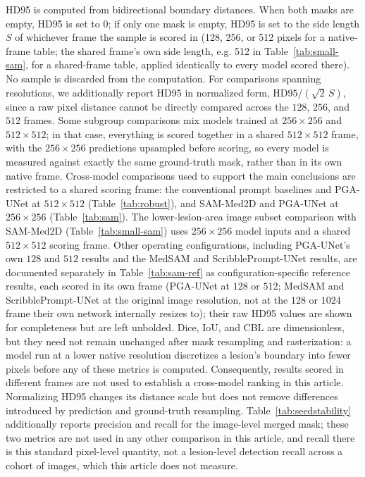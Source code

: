 HD95 is computed from bidirectional boundary distances. When both masks are empty, HD95 is set to 0; if only one mask is empty, HD95 is set to the side length $S$ of whichever frame the sample is scored in (128, 256, or 512 pixels for a native-frame table; the shared frame's own side length, e.g. 512 in Table~\ref{tab:small-sam}, for a shared-frame table, applied identically to every model scored there). No sample is discarded from the computation. For comparisons spanning resolutions, we additionally report HD95 in normalized form, $\mathrm{HD95}/(\sqrt{2}\,S)$, since a raw pixel distance cannot be directly compared across the $128$, $256$, and $512$ frames. Some subgroup comparisons mix models trained at $256\times256$ and $512\times512$; in that case, everything is scored together in a shared $512\times512$ frame, with the $256\times256$ predictions upsampled before scoring, so every model is measured against exactly the same ground-truth mask, rather than in its own native frame. Cross-model comparisons used to support the main conclusions are restricted to a shared scoring frame: the conventional prompt baselines and PGA-UNet at $512\times512$ (Table~\ref{tab:robust}), and SAM-Med2D and PGA-UNet at $256\times256$ (Table~\ref{tab:sam}). The lower-lesion-area image subset comparison with SAM-Med2D (Table~\ref{tab:small-sam}) uses $256\times256$ model inputs and a shared $512\times512$ scoring frame. Other operating configurations, including PGA-UNet's own $128$ and $512$ results and the MedSAM and ScribblePrompt-UNet results, are documented separately in Table~\ref{tab:sam-ref} as configuration-specific reference results, each scored in its own frame (PGA-UNet at $128$ or $512$; MedSAM and ScribblePrompt-UNet at the original image resolution, not at the $128$ or $1024$ frame their own network internally resizes to); their raw HD95 values are shown for completeness but are left unbolded. Dice, IoU, and CBL are dimensionless, but they need not remain unchanged after mask resampling and rasterization: a model run at a lower native resolution discretizes a lesion's boundary into fewer pixels before any of these metrics is computed. Consequently, results scored in different frames are not used to establish a cross-model ranking in this article. Normalizing HD95 changes its distance scale but does not remove differences introduced by prediction and ground-truth resampling. Table~\ref{tab:seedstability} additionally reports precision and recall for the image-level merged mask; these two metrics are not used in any other comparison in this article, and recall there is this standard pixel-level quantity, not a lesion-level detection recall across a cohort of images, which this article does not measure.

